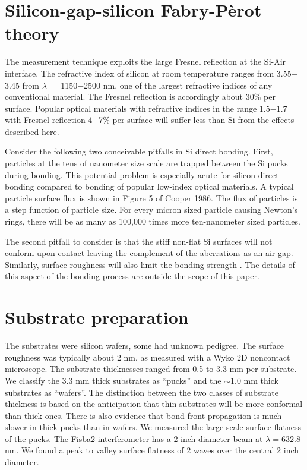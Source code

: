 \documentclass[osajnl,preprint,showpacs,superscriptaddress,12pt]{revtex4-1} %
\begin{document}
\section{Silicon-gap-silicon Fabry-P\`{e}rot theory}

The measurement technique exploits the large Fresnel reflection \cite{2001opt4.book.....H} at the Si-Air interface.  The refractive index of silicon at room temperature ranges from 3.55$-$3.45 from $\lambda = $ 1150$-$2500 nm\cite{2006SPIE.6273E..77F}, one of the largest refractive indices of any conventional material.  The Fresnel reflection is accordingly about 30\% per surface.  Popular optical materials with refractive indices in the range 1.5$-$1.7 with Fresnel reflection 4$-$7\% per surface will suffer less than Si from the effects described here.

Consider the following two conceivable pitfalls in Si direct bonding.  First, particles at the tens of nanometer size scale are trapped between the Si pucks during bonding.  This potential problem is especially acute for silicon direct bonding compared to bonding of popular low-index optical materials.  A typical particle surface flux is shown in Figure 5 of Cooper 1986\cite{doi:10.1080/02786828608959094}.  The flux of particles is a step function of particle size.  For every micron sized particle causing Newton's rings, there will be as many as 100,000 times more ten-nanometer sized particles.

The second pitfall to consider is that the stiff non-flat Si surfaces will not conform upon contact leaving the complement of the aberrations as an air gap. Similarly, surface roughness will also limit the bonding strength  \cite{JJAP.37.4197, 2001JOptA...3...85G}.  The details of this aspect of the bonding process are outside the scope of this paper.  

\section{Substrate preparation}
The substrates were silicon wafers, some had unknown pedigree.  The surface roughness was typically about 2 nm, as measured with a Wyko 2D noncontact microscope.  The substrate thicknesses ranged from 0.5 to 3.3 mm per substrate.  We classify the 3.3 mm thick substrates as ``pucks'' and the $\sim$1.0 mm thick substrates as ``wafers''.  The distinction between the two classes of substrate thickness is based on the anticipation that thin substrates will be more conformal than thick ones.  There is also evidence that bond front propagation is much slower in thick pucks \cite{2007ApOpt..46.6793H} than in wafers.  We measured the large scale surface flatness of the pucks.  The Fisba2 interferometer has a 2 inch diameter beam at $\lambda=$632.8 nm.  We found a peak to valley surface flatness of 2 waves over the central 2 inch diameter.
\end{document}
